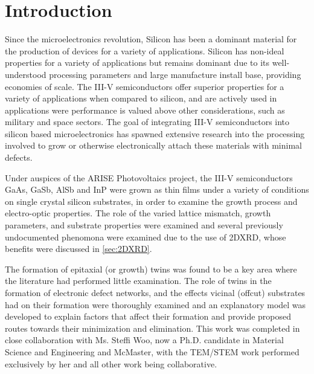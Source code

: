 \section{Introduction}
Since the microelectronics revolution, Silicon has been a dominant material 
for the production of devices for a variety of applications. Silicon has 
non-ideal properties for a variety of applications but remains dominant due 
to its well-understood processing parameters and large manufacture install 
base, providing economies of scale. The III-V semiconductors offer superior 
properties for a variety of applications when compared to silicon, and are 
actively used in applications were performance is valued above other 
considerations, such as military and space sectors. The goal of integrating 
III-V semiconductors into silicon based microelectronics has spawned extensive 
research into the processing involved to grow or otherwise electronically 
attach these materials with minimal defects.

Under auspices of the ARISE Photovoltaics project, the III-V 
semiconductors GaAs, GaSb, AlSb and InP were grown as thin films under a 
variety of conditions on single crystal silicon substrates, in order to 
examine the growth process and electro-optic properties. The role of the 
varied lattice mismatch, growth parameters, and substrate properties were 
examined and several previously undocumented phenomona were examined due to 
the use of 2DXRD, whose benefits were discussed in \cref{sec:2DXRD}.

The formation of epitaxial (or growth) twins was found to be a key area where 
the literature had performed little examination. The role of twins in the 
formation of electronic defect networks, and the effects vicinal (offcut) 
substrates had on their formation were thoroughly examined and an 
explanatory model was developed to explain factors that affect their formation 
and provide proposed routes towards their minimization and 
elimination\cite{Devenyi2011}. This work was completed in close collaboration 
with Ms. Steffi Woo, now a Ph.D. candidate in Material Science and Engineering and 
McMaster, with the TEM/STEM work performed exclusively by her and all other 
work being collaborative.
